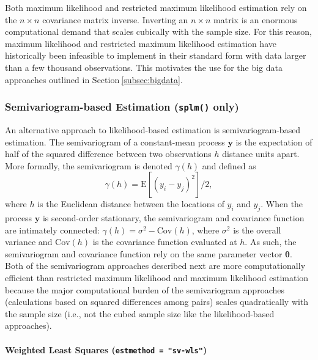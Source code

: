 \documentclass[10pt,letterpaper]{article}
\begin{document}
Both maximum likelihood and restricted maximum likelihood estimation
rely on the \(n \times n\) covariance matrix inverse. Inverting an
\(n \times n\) matrix is an enormous computational demand that scales
cubically with the sample size. For this reason, maximum likelihood and
restricted maximum likelihood estimation have historically been
infeasible to implement in their standard form with data larger than a
few thousand observations. This motivates the use for the big data
approaches outlined in Section\(~\)\ref{subsec:bigdata}.

\hypertarget{semivariogram-based-estimation-splm-only}{%
\subsubsection{\texorpdfstring{Semivariogram-based Estimation
(\texttt{splm()}
only)}{Semivariogram-based Estimation (splm() only)}}\label{semivariogram-based-estimation-splm-only}}

An alternative approach to likelihood-based estimation is
semivariogram-based estimation. The semivariogram of a constant-mean
process \(\mathbf{y}\) is the expectation of half of the squared
difference between two observations \(h\) distance units apart. More
formally, the semivariogram is denoted \(\gamma(h)\) and defined as
\begin{equation*}\label{eq:sv}
  \gamma(h) = \text{E}[(y_i - y_j)^2] / 2 ,
\end{equation*} where \(h\) is the Euclidean distance between the
locations of \(y_i\) and \(y_j\). When the process \(\mathbf{y}\) is
second-order stationary, the semivariogram and covariance function are
intimately connected: \(\gamma(h) = \sigma^2 - \text{Cov}(h)\), where
\(\sigma^2\) is the overall variance and \(\text{Cov}(h)\) is the
covariance function evaluated at \(h\). As such, the semivariogram and
covariance function rely on the same parameter vector
\(\boldsymbol{\theta}\). Both of the semivariogram approaches described
next are more computationally efficient than restricted maximum
likelihood and maximum likelihood estimation because the major
computational burden of the semivariogram approaches (calculations based
on squared differences among pairs) scales quadratically with the sample
size (i.e., not the cubed sample size like the likelihood-based
approaches).

\hypertarget{weighted-least-squares-estmethod-sv-wls}{%
\paragraph{\texorpdfstring{Weighted Least Squares
(\texttt{estmethod\ =\ "sv-wls"})}{Weighted Least Squares (estmethod = "sv-wls")}}\label{weighted-least-squares-estmethod-sv-wls}}
\end{document}
